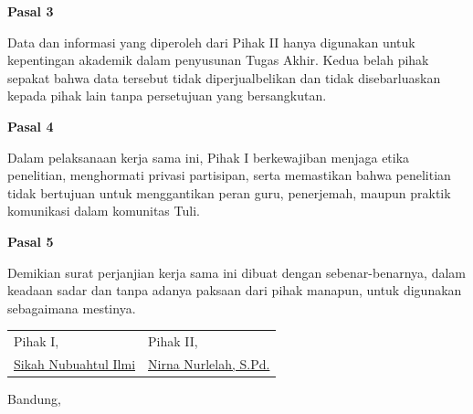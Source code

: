 \vspace{1.5em}

\textbf{Pasal 3}

Data dan informasi yang diperoleh dari Pihak II hanya digunakan untuk kepentingan akademik dalam penyusunan Tugas Akhir. Kedua belah pihak sepakat bahwa data tersebut tidak diperjualbelikan dan tidak disebarluaskan kepada pihak lain tanpa persetujuan yang bersangkutan.

\vspace{1.5em}

\textbf{Pasal 4}

Dalam pelaksanaan kerja sama ini, Pihak I berkewajiban menjaga etika penelitian, 
menghormati privasi partisipan, serta memastikan bahwa penelitian tidak bertujuan 
untuk menggantikan peran guru, penerjemah, maupun praktik komunikasi 
dalam komunitas Tuli.

\vspace{1.5em}

\textbf{Pasal 5}

Demikian surat perjanjian kerja sama ini dibuat dengan sebenar-benarnya, 
dalam keadaan sadar dan tanpa adanya paksaan dari pihak manapun, 
untuk digunakan sebagaimana mestinya.
\vspace{3em}

\begin{tabular}{p{7cm} p{7cm}}
Pihak I, & Pihak II, \\[5em]

\underline{Sikah Nubuahtul Ilmi} &
\underline{Nirna Nurlelah, S.Pd.} \\
\end{tabular}

\vfill

\begin{center}
Bandung, \underline{\hspace{4cm}}
\end{center}
